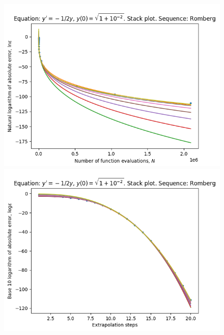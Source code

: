 \begin{figure}[H]
\centering
\begin{minipage}{0.45\textwidth}
\centering
\includegraphics[scale=0.45]{../results/emr_plots/quad_sing_2_hp_romberg_stack.png}
\end{minipage}
\begin{minipage}{0.45\textwidth}
\centering
\includegraphics[scale=0.45]{../results/emr_plots/quad_sing_2_hp_romberg_steps_stack.png}
\end{minipage}
\end{figure}

